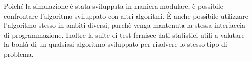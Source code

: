 Poiché la simulazione è stata sviluppata in maniera modulare, è possibile confrontare l'algoritmo sviluppato con altri algoritmi. È anche possibile utilizzare l'algoritmo stesso in ambiti diversi, purchè venga mantenuta la stessa interfaccia di programmazione. Inoltre la suite di test fornisce dati statistici utili a valutare la bontà di un qualsiasi algoritmo sviluppato per risolvere lo stesso tipo di problema. 
